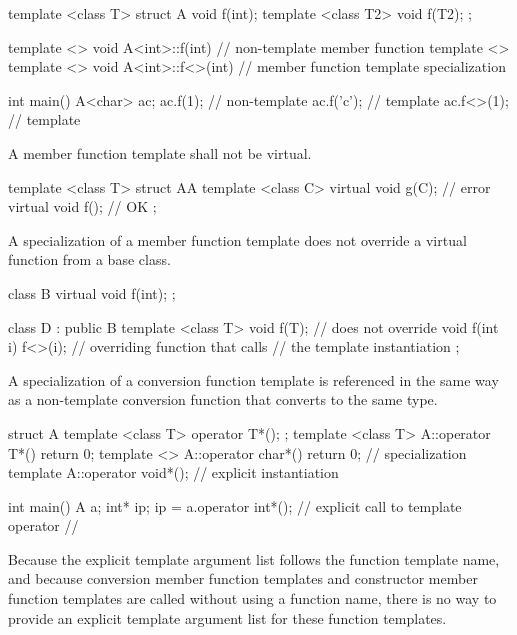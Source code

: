 \begin{codeblock}
template <class T> struct A {
  void f(int);
  template <class T2> void f(T2);
};

template <> void A<int>::f(int) { }                     // non-template member function
template <> template <> void A<int>::f<>(int) { }       // member function template specialization

int main() {
  A<char> ac;
  ac.f(1);          // non-template
  ac.f('c');        // template
  ac.f<>(1);        // template
}
\end{codeblock}
\exitexample

\pnum
A member function template shall not be virtual.
\enterexample

\begin{codeblock}
template <class T> struct AA {
  template <class C> virtual void g(C);   // error
  virtual void f();                       // OK
};
\end{codeblock}
\exitexample

\pnum
A specialization of
a member function template does not override a virtual function from a
base class.
\enterexample

\begin{codeblock}
class B {
  virtual void f(int);
};

class D : public B {
  template <class T> void f(T); // does not override 
  void f(int i) { f<>(i); }     // overriding function that calls
                                // the template instantiation
};
\end{codeblock}
\exitexample

\pnum
A specialization of a
conversion function template
is referenced in
the same way as a non-template conversion function that converts to
the same type.
\enterexample

\begin{codeblock}
struct A {
  template <class T> operator T*();
};
template <class T> A::operator T*(){ return 0; }
template <> A::operator char*(){ return 0; }    // specialization
template A::operator void*();                   // explicit instantiation

int main() {
  A a;
  int* ip;
  ip = a.operator int*();       // explicit call to template operator
                                // 
}
\end{codeblock}
\exitexample
\enternote
Because the explicit template argument list follows the function template
name, and because conversion member function templates and constructor
member function templates are called without using a function name,
there is no way to provide an explicit template argument list for these
function templates.
\exitnote

